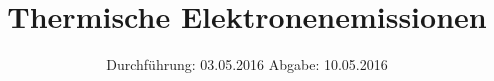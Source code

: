 

\subject{Versuch Nummer 504}
\title{Thermische Elektronenemissionen}
\date{
  Durchführung: 03.05.2016
  \hspace{3em}
  Abgabe: 10.05.2016
}



\maketitle
\thispagestyle{empty}
\tableofcontents
\newpage






\printbibliography


